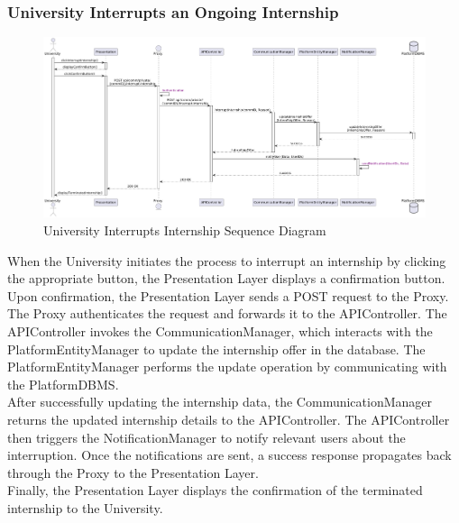 \subsubsection*{University Interrupts an Ongoing Internship}
\begin{figure}[H]
    \centering
    \includegraphics[width=\linewidth]{Latex/Images/DD/SequenceDiagrams/19UniversityInterruptsIntership.png}
    \caption{ University Interrupts Internship Sequence Diagram}
    \label{fig:}
\end{figure}
When the University initiates the process to interrupt an internship by clicking the appropriate button, the Presentation Layer displays a confirmation button. Upon confirmation, the Presentation Layer sends a POST request to the Proxy.\\
The Proxy authenticates the request and forwards it to the APIController. The APIController invokes the CommunicationManager, which interacts with the PlatformEntityManager to update the internship offer in the database. The PlatformEntityManager performs the update operation by communicating with the PlatformDBMS.\\
After successfully updating the internship data, the CommunicationManager returns the updated internship details to the APIController. The APIController then triggers the NotificationManager to notify relevant users about the interruption. Once the notifications are sent, a success response propagates back through the Proxy to the Presentation Layer.\\
Finally, the Presentation Layer displays the confirmation of the terminated internship to the University.
